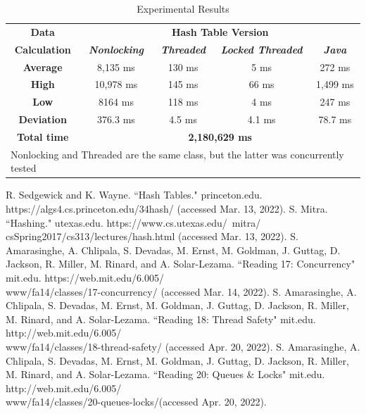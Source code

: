 \documentclass[conference]{IEEEtran}
\begin{document}
\begin{table}[htbp]
    \caption{Experimental Results}
    \begin{center}
    \begin{tabular}{|c|c|c|c|c|}
    \hline
    \textbf{Data}&\multicolumn{4}{|c|}{\textbf{Hash Table Version}} \\
    \cline{2-5} 
    \textbf{Calculation} & \textbf{\textit{Nonlocking}}& \textbf{\textit{Threaded}}& \textbf{\textit{Locked Threaded}}& \textbf{\textit{Java}} \\
    \hline
    \textbf{Average}& 8,135 ms& 130 ms&  5 ms& 272 ms\\
    \hline
    \textbf{High}& 10,978 ms& 145 ms&  66 ms& 1,499 ms\\
    \hline
    \textbf{Low}& 8164 ms& 118 ms&  4 ms& 247 ms\\
    \hline
    \textbf{Deviation}& 376.3 ms& 4.5 ms&  4.1 ms& 78.7 ms\\
    \hline
    \textbf{Total time}&\multicolumn{4}{|c|}{\textbf{2,180,629 ms}} \\
    \hline
    \multicolumn{5}{l}{Nonlocking and Threaded are the same class, but the latter was concurrently tested}
    \end{tabular}
    \label{tab1}
    \end{center}
\end{table}

\begin{thebibliography}{00}
 R. Sedgewick and K. Wayne. ``Hash Tables." princeton.edu. \\https://algs4.cs.princeton.edu/34hash/ (accessed Mar. 13, 2022).
 S. Mitra. ``Hashing." utexas.edu. https://www.cs.utexas.edu/~mitra/\\csSpring2017/cs313/lectures/hash.html (accessed Mar. 13, 2022).
 S. Amarasinghe, A. Chlipala, S. Devadas, M. Ernst, M. Goldman, J. Guttag, D. Jackson, R. Miller, M. Rinard, and A. Solar-Lezama. ``Reading 17: Concurrency"
mit.edu. https://web.mit.edu/6.005/\\www/fa14/classes/17-concurrency/ (accessed Mar. 14, 2022).
 S. Amarasinghe, A. Chlipala, S. Devadas, M. Ernst, M. Goldman, J. Guttag, D. Jackson, R. Miller, M. Rinard, and A. Solar-Lezama. ``Reading 18: Thread Safety"
mit.edu. http://web.mit.edu/6.005/\\www/fa14/classes/18-thread-safety/ (accessed Apr. 20, 2022).
 S. Amarasinghe, A. Chlipala, S. Devadas, M. Ernst, M. Goldman, J. Guttag, D. Jackson, R. Miller, M. Rinard, and A. Solar-Lezama. ``Reading 20: Queues \& Locks"
mit.edu. http://web.mit.edu/6.005/\\www/fa14/classes/20-queues-locks/(accessed Apr. 20, 2022).
\end{thebibliography}
\end{document}
